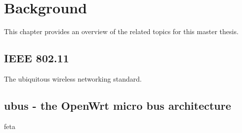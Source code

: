 \chapter{Background}

This chapter provides an overview of the related topics for this master thesis.

\section{IEEE 802.11}

The ubiquitous wireless networking standard.

\section{ubus - the OpenWrt micro bus architecture}

feta


